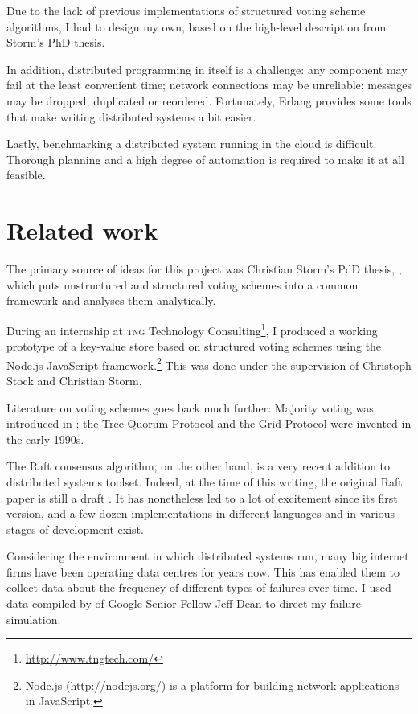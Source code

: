 \documentclass[11pt,chapterprefix=true,toc=bibliography,numbers=noendperiod,
               footnotes=multiple,twoside]{scrreprt}
\begin{document}
Due to the lack of previous implementations of structured voting scheme algorithms, I had to design my own, based on the high-level description from Storm's PhD thesis.\autocite{voting}

In addition, distributed programming in itself is a challenge: any component may fail at the least convenient time; network connections may be unreliable; messages may be dropped, duplicated or reordered. Fortunately, Erlang provides some tools that make writing distributed systems a bit easier.

Lastly, benchmarking a distributed system running in the cloud is difficult. Thorough planning and a high degree of automation is required to make it at all feasible.

\section{Related work\label{sc:related-work}}

The primary source of ideas for this project was Christian Storm's PdD thesis,  \parencite{voting}, which puts unstructured and structured voting schemes into a common framework and analyses them analytically.

During an internship at \textsc{tng} Technology Consulting\footnote{\url{http://www.tngtech.com/}}, I produced a working prototype of a key-value store based on structured voting schemes using the Node.js JavaScript framework.\footnote{Node.js (\url{http://nodejs.org/}) is a platform for building network applications in JavaScript.} This was done under the supervision of Christoph Stock and Christian Storm.

Literature on voting schemes goes back much further: Majority voting was introduced in ; the Tree Quorum Protocol and the Grid Protocol were invented in the early 1990s.

The Raft consensus algorithm, on the other hand, is a very recent addition to distributed systems toolset. Indeed, at the time of this writing, the original Raft paper is still a draft \autocite{raft}. It has nonetheless led to a lot of excitement since its first version, and a few dozen implementations in different languages and in various stages of development exist.

Considering the environment in which distributed systems run, many big internet firms have been operating data centres for years now. This has enabled them to collect data about the frequency of different types of failures over time. I used data compiled by of Google Senior Fellow Jeff Dean to direct my failure simulation. \autocite{distr}
\end{document}
